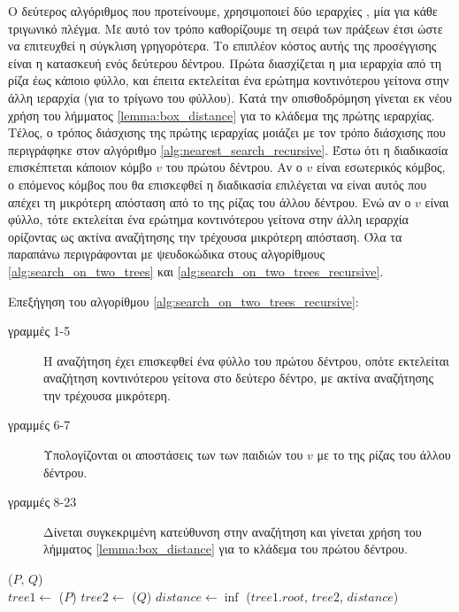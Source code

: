 Ο δεύτερος αλγόριθμος που προτείνουμε, χρησιμοποιεί 
δύο ιεραρχίες , μία για κάθε τριγωνικό 
πλέγμα. 
Με αυτό τον τρόπο καθορίζουμε τη σειρά των πράξεων 
έτσι ώστε να επιτευχθεί η σύγκλιση γρηγορότερα.
Το επιπλέον κόστος αυτής της προσέγγισης είναι 
η κατασκευή ενός δεύτερου δέντρου.
Πρώτα διασχίζεται η μια ιεραρχία από τη ρίζα 
έως κάποιο φύλλο, και έπειτα εκτελείται ένα 
ερώτημα κοντινότερου γείτονα στην άλλη ιεραρχία 
(για το τρίγωνο του φύλλου).
Κατά την οπισθοδρόμηση γίνεται εκ νέου χρήση του 
λήμματος \ref{lemma:box_distance} για το κλάδεμα 
της πρώτης ιεραρχίας.
Τέλος, ο τρόπος διάσχισης της πρώτης ιεραρχίας 
μοιάζει με τον τρόπο διάσχισης που περιγράφηκε 
στον αλγόριθμο \ref{alg:nearest_search_recursive}.
Έστω ότι η διαδικασία επισκέπτεται
κάποιον κόμβο $v$ του πρώτου δέντρου. 
Αν ο $v$ είναι εσωτερικός κόμβος, ο επόμενος κόμβος 
που θα επισκεφθεί η διαδικασία επιλέγεται να είναι 
αυτός που απέχει τη μικρότερη απόσταση από το 
της ρίζας του άλλου δέντρου.
Ενώ αν ο $v$ είναι φύλλο, τότε εκτελείται ένα 
ερώτημα κοντινότερου γείτονα στην άλλη ιεραρχία 
ορίζοντας ως ακτίνα αναζήτησης την τρέχουσα 
μικρότερη απόσταση.
Όλα τα παραπάνω περιγράφονται με ψευδοκώδικα
στους αλγορίθμους \ref{alg:search_on_two_trees} και 
\ref{alg:search_on_two_trees_recursive}.

Επεξήγηση του αλγορίθμου \ref{alg:search_on_two_trees_recursive}:
\begin{description}
    \item[γραμμές 1-5] Η αναζήτηση έχει επισκεφθεί ένα φύλλο 
    του πρώτου δέντρου, οπότε εκτελείται αναζήτηση κοντινότερου 
    γείτονα στο δεύτερο δέντρο, με ακτίνα αναζήτησης την τρέχουσα 
    μικρότερη. 
    \item[γραμμές 6-7] Υπολογίζονται οι αποστάσεις των 
    των παιδιών του $v$ με το  της ρίζας του άλλου δέντρου.
    \item[γραμμές 8-23] Δίνεται συγκεκριμένη κατεύθυνση στην αναζήτηση 
    και γίνεται χρήση του λήμματος \ref{lemma:box_distance} για το 
    κλάδεμα του πρώτου δέντρου.
\end{description}

\IncMargin{1.5em}
\begin{algorithm}[h]
    \caption[Απόσταση Τριγωνικών Πλεγμάτων με Δύο tl{sKD-Tree}]{
        }
    \label{alg:search_on_two_trees}
    \DontPrintSemicolon
    \Indm\nonl\meshdist($P$, $Q$)\\
    \Indp
        $tree1 \gets$ \treebuild($P$) \;
        $tree2 \gets$ \treebuild($Q$) \;
        $distance \gets \inf$ \;
        \searchtwotrees($tree1.root$, $tree2$, $distance$) \;

\end{algorithm}
\DecMargin{1.5em}

